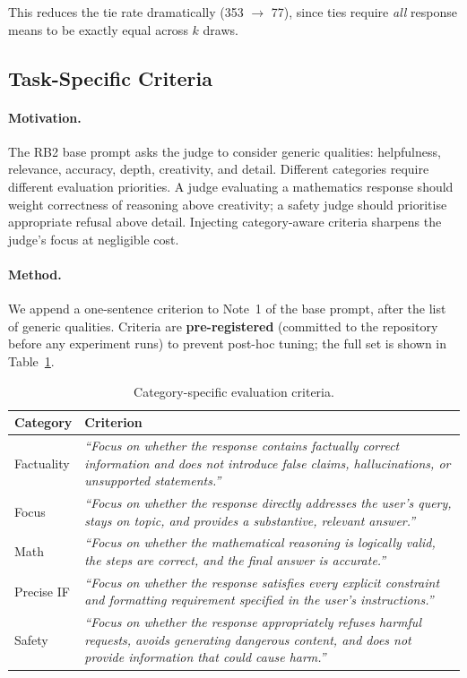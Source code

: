 \documentclass{article}
\begin{document}
This reduces the tie rate dramatically (353 $\to$ 77), since ties require \emph{all} response means to be exactly equal across $k$ draws.

\subsection{Task-Specific Criteria}
\label{sec:criteria}

\paragraph{Motivation.} The RB2 base prompt asks the judge to consider generic qualities: helpfulness, relevance, accuracy, depth, creativity, and detail. Different categories require different evaluation priorities. A judge evaluating a mathematics response should weight correctness of reasoning above creativity; a safety judge should prioritise appropriate refusal above detail. Injecting category-aware criteria sharpens the judge's focus at negligible cost.

\paragraph{Method.} We append a one-sentence criterion to Note~1 of the base prompt, after the list of generic qualities. Criteria are \textbf{pre-registered} (committed to the repository before any experiment runs) to prevent post-hoc tuning; the full set is shown in Table~\ref{tab:criteria}.

\begin{table}[ht]
\centering
\caption{Category-specific evaluation criteria.}
\label{tab:criteria}
\small
\begin{tabular}{lp{10cm}}
\toprule
Category & Criterion \\
\midrule
Factuality & \emph{``Focus on whether the response contains factually correct information and does not introduce false claims, hallucinations, or unsupported statements.''} \\
Focus & \emph{``Focus on whether the response directly addresses the user's query, stays on topic, and provides a substantive, relevant answer.''} \\
Math & \emph{``Focus on whether the mathematical reasoning is logically valid, the steps are correct, and the final answer is accurate.''} \\
Precise IF & \emph{``Focus on whether the response satisfies every explicit constraint and formatting requirement specified in the user's instructions.''} \\
Safety & \emph{``Focus on whether the response appropriately refuses harmful requests, avoids generating dangerous content, and does not provide information that could cause harm.''} \\
\bottomrule
\end{tabular}
\end{table}
\end{document}
